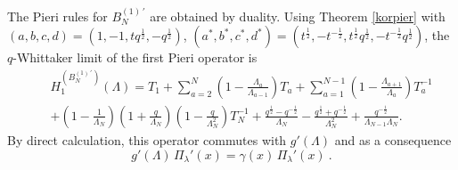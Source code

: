 \documentclass[12pt]{amsart}
\newcommand{\lL}{{\Lambda}}
\newcommand{\half}{\frac{1}{2}}
\numberwithin{equation}{section}
\begin{document}
The Pieri rules for $B_N^{(1)\,'}$ are obtained by duality. Using Theorem \ref{korpier} with
$(a,b,c,d)=(1,-1,t q^\half,-q^\half)$, $(a^*,b^*,c^*,d^*)=(t^\half,-t^{-\half},t^\half q^\half,-t^{-\half} q^\half)$, the $q$-Whittaker limit of the first Pieri operator is
\begin{eqnarray*}&&H_1^{(B_N^{(1)\,'})}(\lL) =T_1+\sum_{a=2}^N \left(1-\frac{\lL_{a}}{\lL_{a-1}}\right) T_a +\sum_{a=1}^{N-1} \left(1-\frac{\lL_{a+1}}{\lL_{a}}\right) T_a^{-1}\\
&&+\left(1-\frac{1}{\lL_{N}}\right)\left(1+\frac{q}{\lL_{N}}\right)\left(1-\frac{q}{\lL_{N}^2}\right) T_N^{-1}+ \frac{q^\half-q^{-\half}}{\lL_N} -\frac{q^\half+q^{-\half}}{\lL_N^2}+\frac{q^{-\half}}{\lL_{N-1}\lL_N}.
\end{eqnarray*}
By direct calculation, this operator commutes with $g'(\Lambda)$ and as a consequence
\begin{equation}\label{cmhamprime}
%
%
%
%
g'(\lL)\, \Pi_\lambda'(x)=\gamma(x)\, \Pi_\lambda'(x)\ .
\end{equation}
%
\end{document}
